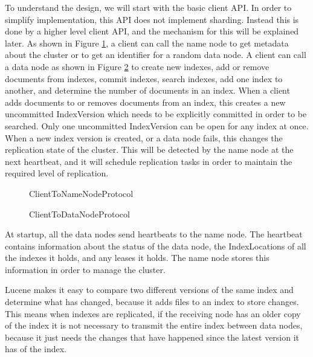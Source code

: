\documentclass[a4paper,10pt]{article}
\begin{document}
To understand the design, we will start with the basic client API. In order to simplify implementation, this API does not implement sharding. Instead this is done by a higher level client API, and the mechanism for this will be explained later. As shown in Figure \ref{ClientToNameNodeProtocol}, a client can call the name node to get metadata about the cluster or to get an identifier for a random data node. A client can call a data node as shown in Figure \ref{ClientToDataNodeProtocol} to create new indexes, add or remove documents from indexes, commit indexes, search indexes, add one index to another, and determine the number of documents in an index. When a client adds documents to or removes documents from an index, this creates a new uncommitted IndexVersion which needs to be explicitly committed in order to be searched. Only one uncommitted IndexVersion can be open for any index at once. When a new index version is created, or a data node fails, this changes the replication state of the cluster. This will be detected by the name node at the next heartbeat, and it will schedule replication tasks in order to maintain the required level of replication. 

\begin{figure}

\caption{ClientToNameNodeProtocol}
\label{ClientToNameNodeProtocol}
\end{figure}

\begin{figure}

\caption{ClientToDataNodeProtocol}
\label{ClientToDataNodeProtocol}
\end{figure}

At startup, all the data nodes send heartbeats to the name node. The heartbeat contains information about the status of the data node, the IndexLocations of all the indexes it holds, and any leases it holds. The name node stores this information in order to manage the cluster. 

Lucene makes it easy to compare two different versions of the same index and determine what has changed, because it adds files to an index to store changes. This means when indexes are replicated, if the receiving node has an older copy of the index it is not necessary to transmit the entire index between data nodes, because it just needs the changes that have happened since the latest version it has of the index. 
\end{document}
